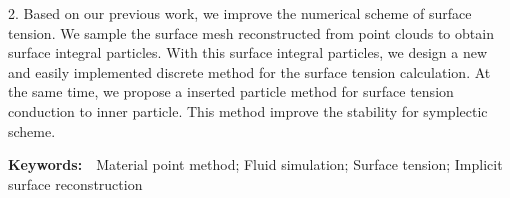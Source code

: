     2. Based on our previous work, we improve the numerical scheme of surface tension. We sample the surface mesh reconstructed from point clouds to obtain surface integral particles. With this surface 
    integral particles, we design a new and easily implemented discrete method for the surface tension calculation. At the same time, we propose a inserted particle method for surface tension conduction to inner particle.
    This method improve the stability for symplectic scheme.


\vspace{1em}

\textbf{Keywords:}~~Material point method; Fluid simulation; Surface tension; Implicit surface reconstruction
